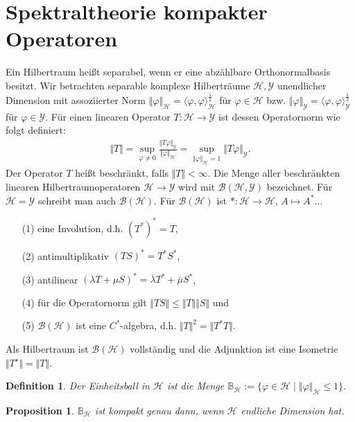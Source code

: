 \documentclass[11pt, hidelinks]{article}
\newcommand{\h}{\mathcal{H}}
\newcommand{\B}{\mathcal{B}}
\numberwithin{conj}{section}
\newtheorem{definition}[conj]{Definition}
\newtheorem{proposition}[conj]{Proposition}
\begin{document}
\section{Spektraltheorie kompakter Operatoren}
Ein Hilbertraum heißt separabel, wenn er eine abzählbare Orthonormalbasis besitzt. Wir betrachten separable komplexe Hilberträume $\h, \mathcal{Y}$ unendlicher Dimension mit assoziierter Norm $\Vert \varphi \Vert_{\h} = \langle \varphi, \varphi \rangle^{\frac{1}{2}}_{\h}$ für $\varphi \in \h$ bzw. $\Vert \varphi \Vert_{\mathcal{Y}} = \langle \varphi, \varphi \rangle^{\frac{1}{2}}_{\mathcal{Y}}$ für $\varphi \in \mathcal{Y}$. Für einen linearen Operator $T: \h \rightarrow \mathcal{Y}$ ist dessen Operatornorm wie folgt definiert:
\begin{align}
    \Vert T \Vert = \sup_{\varphi \neq 0} \frac{\Vert T\varphi \Vert_{\mathcal{Y}}}{\Vert\varphi\Vert_\h} = \sup_{\Vert\varphi\Vert_\h = 1} \Vert T\varphi\Vert_{\mathcal{Y}}.
\end{align}
Der Operator $T$ heißt beschränkt, falls $\Vert T \Vert < \infty$. Die Menge aller beschränkten linearen Hilbertraumoperatoren $\h \to \mathcal{Y}$ wird mit $\B(\h,\mathcal{Y})$ bezeichnet. Für $\h = \mathcal{Y}$ schreibt man auch $\B(\h)$. Für $\B(\h)$ ist $\ast: \h \to \h$, $A \mapsto A^\ast \ldots$
\begin{enumerate}
    \item[(1)] eine Involution, d.h. $(T^\ast)^\ast = T$,
    \item[(2)] antimultiplikativ $(TS)^\ast = T^\ast S^\ast$,
    \item[(3)] antilinear $(\lambda T + \mu S)^\ast = \overline{\lambda} T^\ast + \overline{\mu} S^\ast$,
    \item[(4)] für die Operatornorm gilt $\Vert TS  \Vert \leq \Vert T \Vert \Vert S \Vert$ und
    \item[(5)] $\B(\h)$ ist eine $C^\ast$-algebra, d.h. $\Vert T \Vert^2 = \Vert T^\ast T \Vert$.
\end{enumerate}
Als Hilbertraum ist $\B(\h)$ vollständig und die Adjunktion ist eine Isometrie $\Vert T^\star \Vert = \Vert T \Vert$.

\begin{definition}
    Der Einheitsball in $\h$ ist die Menge $\mathbb{B}_\h := \{ \varphi \in \h \; \vert \; \Vert \varphi \Vert_\h \leq 1 \}$.
\end{definition}

\begin{proposition}
    $\mathbb{B}_\h$ ist kompakt genau dann, wenn $\h$ endliche Dimension hat.
\end{proposition}
\end{document}
